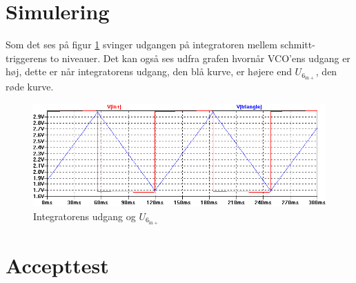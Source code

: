 \section{Simulering}
\label{volumenkontrol-simulering}

Som det ses på figur \ref{fig:vco-signal} svinger udgangen på integratoren mellem schmitt-triggerens to niveauer. Det kan også ses udfra grafen hvornår VCO'ens udgang er høj, dette er når integratorens udgang, den blå kurve, er højere end $U_{6_{\mathrm{in+}}}$, den røde kurve.

\begin{figure}[h]
\centering
\includegraphics[width=\textwidth]{teknisk/volumenkontrol/vco-signal.png}
\caption{Integratorens udgang og $U_{6_{\mathrm{in+}}}$}
\label{fig:vco-signal}
\end{figure}


\section{Accepttest}
\label{volumenkontrol-accepttest}

